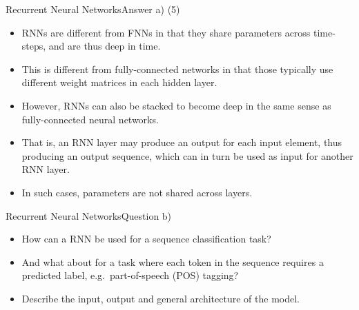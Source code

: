 \documentclass[t]{beamer}
\begin{document}
\begin{frame}{Recurrent Neural Networks}{Answer a) (5)}
    \begin{itemize}
        \item RNNs are different from FNNs in that they share parameters across
              time-steps, and are thus deep in time.
        \item This is different from fully-connected networks in that those
              typically use different weight matrices in each hidden layer.
        \item However, RNNs can also be stacked to become deep in the same sense
              as fully-connected neural networks.
        \item That is, an RNN layer may produce an output for each input
              element, thus producing an output sequence, which can in turn be
              used as input for another RNN layer.
        \item In such cases, parameters are not shared across layers.
    \end{itemize}
\end{frame}

\begin{frame}{Recurrent Neural Networks}{Question b)}
    \begin{itemize}
        \item How can a RNN be used for a sequence classification task?
        \item And what about for a task where each token in the sequence
              requires a predicted label, e.g.\ part-of-speech (POS) tagging?
        \item Describe the input, output and general architecture of the model.
    \end{itemize}
\end{frame}
\end{document}
